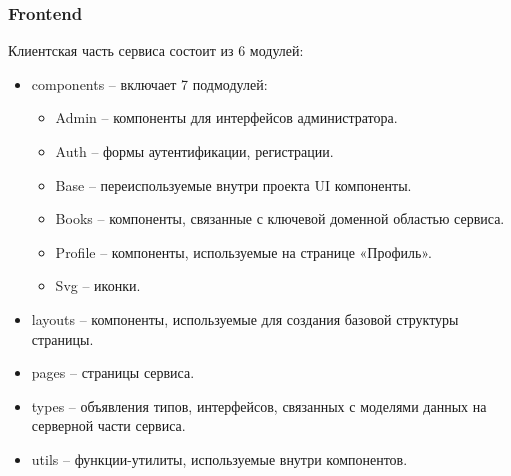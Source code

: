 \documentclass[./project.tex]{subfiles}
\begin{document}
\subsubsection{Frontend}
\par
Клиентская часть сервиса состоит из 6 модулей:
\begin{itemize}
  \item components – включает 7 подмодулей:
  \begin{itemize}
    \item Admin – компоненты для интерфейсов администратора.
    \item Auth – формы аутентификации, регистрации.
    \item Base – переиспользуемые внутри проекта UI компоненты.
    \item Books – компоненты, связанные с ключевой доменной областью сервиса.
    \item Profile – компоненты, используемые на странице «Профиль».
    \item Svg – иконки.
  \end{itemize}
  \item layouts – компоненты, используемые для создания базовой структуры страницы.
  \item pages – страницы сервиса.
  \item types – объявления типов, интерфейсов, связанных с моделями данных на серверной части сервиса.
  \item utils – функции-утилиты, используемые внутри компонентов.
\end{itemize}
\end{document}
